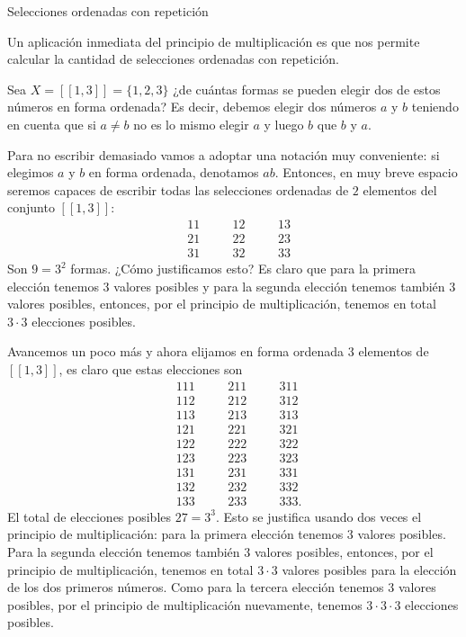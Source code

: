 \begin{section}{Selecciones ordenadas con repetición}

Un aplicación inmediata del principio de multiplicación  es que nos permite calcular la cantidad de selecciones ordenadas con repetición. 

\begin{ejemplo*} Sea  $X = [[ 1 , 3]] = \{ 1, 2, 3 \}$ ¿de cuántas formas se pueden elegir dos de estos números en forma ordenada?
Es decir, debemos elegir dos números $a$ y $b$ teniendo en cuenta que si $a\not=b$ no es lo mismo elegir $a$ y luego $b$ que $b$ y $a$.  

Para no escribir demasiado vamos a adoptar una notación muy conveniente: si elegimos $a$ y $b$ en forma ordenada, denotamos $ab$. Entonces, en muy breve espacio seremos capaces de escribir todas las selecciones ordenadas de $2$ elementos del  conjunto  $[[ 1 , 3]]$:
\begin{align*}
&11&\quad &12&\quad &13 \\
&21&\quad &22&\quad &23\\
&31&\quad &32&\quad &33
\end{align*}
Son $9 = 3^2$ formas. ¿Cómo justificamos esto? Es claro que para la primera elección tenemos $3$ valores posibles y para la segunda elección tenemos también $3$ valores posibles, entonces, por el principio de multiplicación, tenemos en total $3\cdot 3$ elecciones posibles.  

Avancemos un poco más y ahora elijamos en forma ordenada $3$ elementos de  $[[ 1 , 3]]$, es claro que estas elecciones son
\begin{align*}
&1 1 1&\quad &211&\quad &311 \\
&1 1 2&\quad & 212&\quad & 312\\
&1 1 3&\quad & 213&\quad & 313\\
&1 2 1&\quad & 221&\quad & 321\\
&1 2 2&\quad & 222&\quad & 322\\
&1 2 3&\quad & 223&\quad & 323\\
&1 3 1&\quad & 231&\quad & 331\\
&1 3 2&\quad & 232&\quad & 332\\
&1 3 3&\quad & 233&\quad & 333.
\end{align*}
El total de elecciones posibles $27 = 3^3$. Esto se justifica usando dos veces el principio de multiplicación: para la primera elección tenemos $3$ va\-lo\-res posibles. Para la segunda elección tenemos también $3$ valores posibles, entonces, por el principio de multiplicación, tenemos en total $3\cdot 3$ va\-lo\-res posibles para la elección de los dos primeros números. Como para la tercera elección tenemos $3$ valores posibles, por el principio de multiplicación nuevamente, tenemos   $3\cdot 3 \cdot 3$ elecciones posibles.





\end{ejemplo*}
\end{section}
